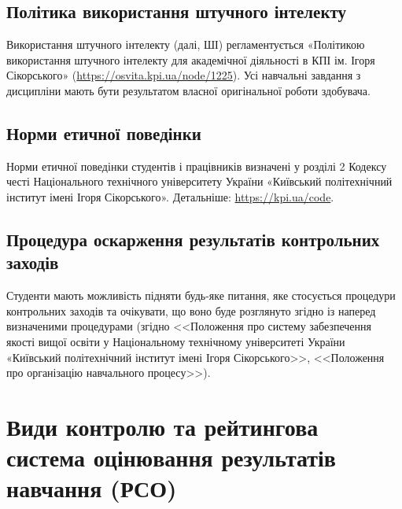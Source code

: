 \documentclass{Syllabus}
\begin{document}
\subsection*{Політика використання штучного інтелекту}

Використання штучного інтелекту (далі, ШІ) регламентується «Політикою використання штучного інтелекту для академічної діяльності в КПІ ім. Ігоря Сікорського» (\url{https://osvita.kpi.ua/node/1225}). Усі навчальні завдання з дисципліни мають бути результатом власної оригінальної роботи здобувача.

\subsection*{Норми етичної поведінки}

Норми етичної поведінки студентів і працівників визначені у розділі 2 Кодексу честі Національного технічного університету України «Київський політехнічний інститут імені Ігоря Сікорського». Детальніше: \url{https://kpi.ua/code}.

\subsection*{Процедура оскарження результатів контрольних заходів}

Студенти мають можливість підняти будь-яке питання, яке стосується процедури контрольних заходів та очікувати, що воно буде розглянуто згідно із наперед визначеними процедурами (згідно <<Положення про систему забезпечення якості вищої освіти у Національному технічному університеті України «Київський політехнічний інститут імені Ігоря Сікорського>>, <<Положення про організацію навчального процесу>>).

\section{Види контролю та рейтингова система оцінювання результатів навчання (РСО)}

%
\end{document}
